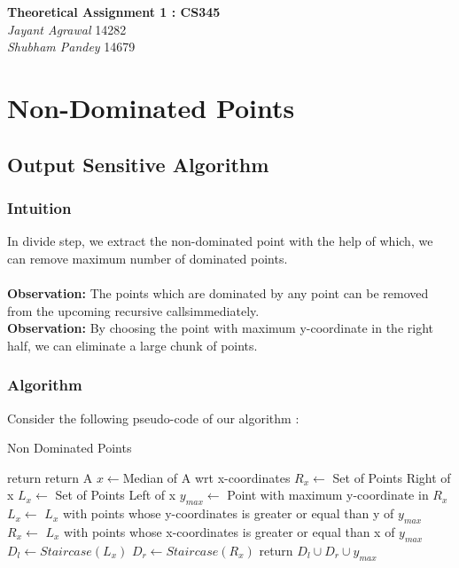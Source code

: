\documentclass{article}
\begin{document}

\begin{center}
\textbf{\Large Theoretical Assignment 1 : CS345} \\
\textit{\large Jayant Agrawal}         14282 \\
\textit{\large Shubham Pandey}         14679
\end{center}

\section{Non-Dominated Points}

\subsection{Output Sensitive Algorithm}
\subsubsection{Intuition}
In divide step, we extract the non-dominated point with the help of which, we can remove maximum number of dominated points.\\ \\
\textbf{Observation: }The points which are dominated by any point can be removed from the upcoming recursive calls\newline immediately.\\
\textbf{Observation: }By choosing the point with maximum y-coordinate in the right half, we can eliminate a large chunk of points.

\subsubsection{Algorithm}
Consider the following pseudo-code of our algorithm :
\begin{algorithm}
\caption{Non Dominated Points}
\label{ndp}
\begin{algorithmic}[1]
\State return
\EndIf
{} 
\State return A
\Else
\State $x \gets $Median of A wrt x-coordinates  
\State $R_x \gets $ Set of Points Right of x   
\State $L_x \gets $ Set of Points Left of x   
\State $y_{max} \gets$ Point with maximum y-coordinate in $R_x$   
\State $L_x \gets$ $L_x$ with points whose y-coordinates is greater or equal than y of $y_{max}$   
\State $R_x \gets$ $L_x$ with points whose x-coordinates is greater or equal than x of $y_{max}$   
\State $D_l \gets Staircase(L_x)$    
\State $D_r \gets Staircase(R_x)$ 
\State return $D_l \cup D_r \cup y_{max} $
\EndIf
\EndProcedure
\end{algorithmic}
\end{algorithm}
\end{document}
